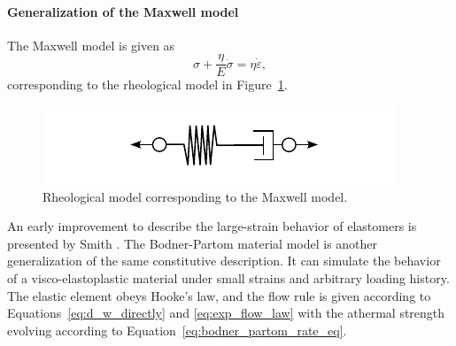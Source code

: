 \paragraph{Generalization of the Maxwell model}
The Maxwell model is given as
\begin{equation}
	\sigma + \frac{\eta}{E}\dot \sigma = \eta \dot \varepsilon,
\end{equation}
corresponding to the rheological model in Figure~\ref{fig:rheo_model_maxwell}.
\begin{figure}
	\centering
	\includegraphics{figures/rheo_model_maxwell}
	\caption{Rheological model corresponding to the Maxwell model.}
\label{fig:rheo_model_maxwell}
\end{figure}
An early improvement to describe the large-strain behavior of elastomers is presented by Smith \citep{smithNonlinearViscoelasticResponse1962}.
The Bodner-Partom material model \citep{bodnerConstitutiveEquationsElasticViscoplastic1975} is another generalization of the same constitutive description.
It can simulate the behavior of a visco-elastoplastic material under small strains and arbitrary loading history.
The elastic element obeys Hooke's law, and the flow rule is given according to Equations~\eqref{eq:d_w_directly} and \eqref{eq:exp_flow_law} with the athermal strength evolving according to Equation~\eqref{eq:bodner_partom_rate_eq}.

